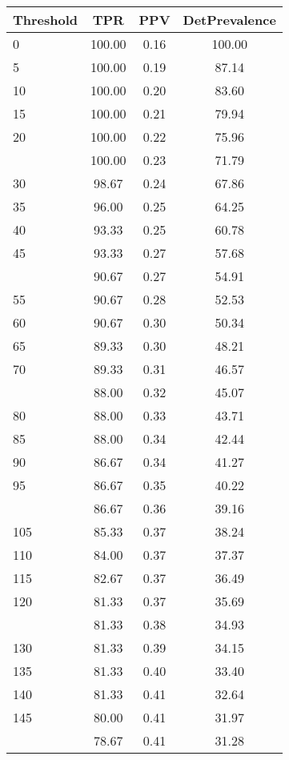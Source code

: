 \begin{table}[ht]
\centering
\begin{tabular}{lccc}
  \toprule
Threshold & TPR & PPV & DetPrevalence \\ 
  \midrule
0 & 100.00 & 0.16 & 100.00 \\ 
  5 & 100.00 & 0.19 & 87.14 \\ 
  10 & 100.00 & 0.20 & 83.60 \\ 
  15 & 100.00 & 0.21 & 79.94 \\ 
  20 & 100.00 & 0.22 & 75.96 \\ 
   \addlinespace
25 & 100.00 & 0.23 & 71.79 \\ 
  30 & 98.67 & 0.24 & 67.86 \\ 
  35 & 96.00 & 0.25 & 64.25 \\ 
  40 & 93.33 & 0.25 & 60.78 \\ 
  45 & 93.33 & 0.27 & 57.68 \\ 
   \addlinespace
50 & 90.67 & 0.27 & 54.91 \\ 
  55 & 90.67 & 0.28 & 52.53 \\ 
  60 & 90.67 & 0.30 & 50.34 \\ 
  65 & 89.33 & 0.30 & 48.21 \\ 
  70 & 89.33 & 0.31 & 46.57 \\ 
   \addlinespace
75 & 88.00 & 0.32 & 45.07 \\ 
  80 & 88.00 & 0.33 & 43.71 \\ 
  85 & 88.00 & 0.34 & 42.44 \\ 
  90 & 86.67 & 0.34 & 41.27 \\ 
  95 & 86.67 & 0.35 & 40.22 \\ 
   \addlinespace
100 & 86.67 & 0.36 & 39.16 \\ 
  105 & 85.33 & 0.37 & 38.24 \\ 
  110 & 84.00 & 0.37 & 37.37 \\ 
  115 & 82.67 & 0.37 & 36.49 \\ 
  120 & 81.33 & 0.37 & 35.69 \\ 
   \addlinespace
125 & 81.33 & 0.38 & 34.93 \\ 
  130 & 81.33 & 0.39 & 34.15 \\ 
  135 & 81.33 & 0.40 & 33.40 \\ 
  140 & 81.33 & 0.41 & 32.64 \\ 
  145 & 80.00 & 0.41 & 31.97 \\ 
   \addlinespace
150 & 78.67 & 0.41 & 31.28 \\ 

\end{tabular}
\end{table}
